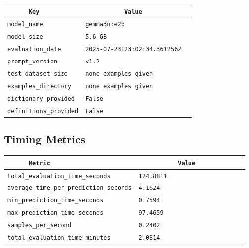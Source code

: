 \documentclass{article}
\begin{document}
\begin{center}
\begin{tabular}{l | l} \hline
    \verb|      Key      | & \verb|           Value           | \\ \hline
    \hline
    \verb|model_name    | & \verb|gemma3n:e2b                  | \\ \hline
    \verb|model_size    | & \verb|5.6 GB                       | \\ \hline
    \verb|evaluation_date| & \verb|2025-07-23T23:02:34.361256Z  | \\ \hline
    \verb|prompt_version| & \verb|v1.2                         | \\ \hline
    \verb|test_dataset_size| & \verb|none examples given          | \\ \hline
    \verb|examples_directory| & \verb|none examples given          | \\ \hline
    \verb|dictionary_provided| & \verb|False                        | \\ \hline
    \verb|definitions_provided| & \verb|False                        | \\ \hline
\end{tabular}
\end{center}

\subsection{Timing Metrics}

\begin{center}
\begin{tabular}{l | l} \hline
    \verb|      Metric     | & \verb|           Value           | \\ \hline
    \hline
    \verb|total_evaluation_time_seconds| & \verb|124.8811                     | \\ \hline
    \verb|average_time_per_prediction_seconds| & \verb|4.1624                       | \\ \hline
    \verb|min_prediction_time_seconds| & \verb|0.7594                       | \\ \hline
    \verb|max_prediction_time_seconds| & \verb|97.4659                      | \\ \hline
    \verb|samples_per_second| & \verb|0.2402                       | \\ \hline
    \verb|total_evaluation_time_minutes| & \verb|2.0814                       | \\ \hline
\end{tabular}
\end{center}
\end{document}
